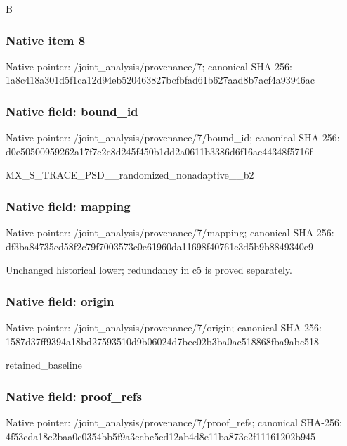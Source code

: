 \documentclass[10pt,a4paper]{article}
\begin{document}
\begingroup\raggedright\sloppy B\par\endgroup

\subsubsection{Native item 8}
Native pointer: /joint\_\allowbreak{}analysis/provenance/7; canonical SHA-256: 1a8c418a301d5f1ca12d94eb520463827bcfbfad61b627aad8b7acf4a93946ac

\subsubsection{Native field: bound\_\allowbreak{}id}
Native pointer: /joint\_\allowbreak{}analysis/provenance/7/bound\_\allowbreak{}id; canonical SHA-256: d0e50500959262a17f7e2c8d245f450b1dd2a0611b3386d6f16ac44348f5716f

\begingroup\raggedright\sloppy MX\_\allowbreak{}S\_\allowbreak{}TRACE\_\allowbreak{}PSD\_\allowbreak{}\_\allowbreak{}randomized\_\allowbreak{}nonadaptive\_\allowbreak{}\_\allowbreak{}b2\par\endgroup

\subsubsection{Native field: mapping}
Native pointer: /joint\_\allowbreak{}analysis/provenance/7/mapping; canonical SHA-256: df3ba84735cd58f2c79f7003573c0e61960da11698f40761e3d5b9b8849340e9

\begingroup\raggedright\sloppy Unchanged historical lower;\allowbreak{} redundancy in c5 is proved separately.\par\endgroup

\subsubsection{Native field: origin}
Native pointer: /joint\_\allowbreak{}analysis/provenance/7/origin; canonical SHA-256: 1587d37ff9394a18bd27593510d9b06024d7bec02b3ba0ac518868fba9abc518

\begingroup\raggedright\sloppy retained\_\allowbreak{}baseline\par\endgroup

\subsubsection{Native field: proof\_\allowbreak{}refs}
Native pointer: /joint\_\allowbreak{}analysis/provenance/7/proof\_\allowbreak{}refs; canonical SHA-256: 4f53cda18c2baa0c0354bb5f9a3ecbe5ed12ab4d8e11ba873c2f11161202b945
\end{document}
